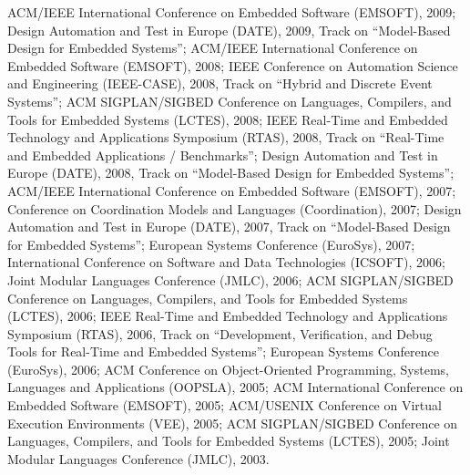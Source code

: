 {\begin{itemize}
ACM/IEEE International Conference on Embedded Software (EMSOFT), 2009;
Design Automation and Test in Europe (DATE), 2009, Track on ``Model-Based Design for Embedded Systems'';
ACM/IEEE International Conference on Embedded Software (EMSOFT), 2008;
IEEE Conference on Automation Science and Engineering (IEEE-CASE), 2008, Track on ``Hybrid and Discrete Event
Systems'';
ACM SIGPLAN/SIGBED Conference on Languages, Compilers, and Tools for Embedded Systems (LCTES), 2008;
IEEE Real-Time and Embedded Technology and Applications Symposium (RTAS), 2008, Track on ``Real-Time and Embedded Applications / Benchmarks'';
Design Automation and Test in Europe (DATE), 2008, Track on ``Model-Based Design for Embedded Systems'';
ACM/IEEE International Conference on Embedded Software (EMSOFT), 2007;
Conference on Coordination Models and Languages (Coordination), 2007;
Design Automation and Test in Europe (DATE), 2007, Track on ``Model-Based Design for Embedded Systems'';
European Systems Conference (EuroSys), 2007;
International Conference on Software and Data Technologies (ICSOFT), 2006;
Joint Modular Languages Conference (JMLC), 2006;
ACM SIGPLAN/SIGBED Conference on Languages, Compilers, and Tools for Embedded Systems (LCTES), 2006;
IEEE Real-Time and Embedded Technology and Applications Symposium (RTAS), 2006, Track on ``Development, Verification, and Debug Tools for Real-Time and Embedded Systems'';
European Systems Conference (EuroSys), 2006;
ACM Conference on Object-Oriented Programming, Systems, Languages and Applications (OOPSLA), 2005;
ACM International Conference on Embedded Software (EMSOFT), 2005;
ACM/USENIX Conference on Virtual Execution Environments (VEE), 2005;
ACM SIGPLAN/SIGBED Conference on Languages, Compilers, and Tools for Embedded Systems (LCTES), 2005;
Joint Modular Languages Conference (JMLC), 2003.
\end{itemize}
}


